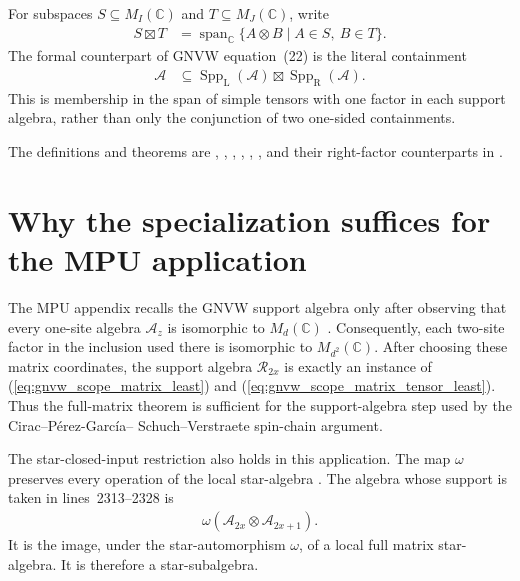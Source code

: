 \documentclass[11pt]{article}
\begin{document}
For subspaces $S\subseteq M_I(\mathbb C)$ and
$T\subseteq M_J(\mathbb C)$, write
\begin{align}
    S\boxtimes T
    &=\operatorname{span}_{\mathbb C}
      \{A\otimes B\mid A\in S,\ B\in T\}.
\end{align}
The formal counterpart of GNVW equation~(22) is the literal containment
\begin{align}
    \mathcal A
    &\subseteq
      \operatorname{Spp}_{\mathrm L}(\mathcal A)
      \boxtimes
      \operatorname{Spp}_{\mathrm R}(\mathcal A).
    \label{eq:gnvw_scope_matrix_two_factor}
\end{align}
This is membership in the span of simple tensors with one factor in each
support algebra, rather than only the conjunction of two one-sided
containments.

The definitions and theorems are
,
,
,
,
,
, and their
right-factor counterparts in
.

\section{Why the specialization suffices for the MPU application}

The MPU appendix recalls the GNVW support algebra only after observing that
every one-site algebra $\mathcal A_z$ is isomorphic to $M_d(\mathbb C)$
\cite[lines~2320--2334]{Cirac2017MPU}.
Consequently, each two-site factor in the inclusion used there is isomorphic
to $M_{d^2}(\mathbb C)$. After choosing these matrix coordinates, the support
algebra $\mathcal R_{2x}$ is exactly an instance of
(\ref{eq:gnvw_scope_matrix_least}) and
(\ref{eq:gnvw_scope_matrix_tensor_least}). Thus the full-matrix theorem is
sufficient for the support-algebra step used by the Cirac--P\'erez-Garc\'ia--
Schuch--Verstraete spin-chain argument.

The star-closed-input restriction also holds in this application.  The map
$\omega$ preserves every operation of the local star-algebra
\cite[lines~2300--2306]{Cirac2017MPU}.  The algebra whose support is taken in
lines~2313--2328 is
\begin{align}
    \omega(\mathcal A_{2x}\otimes\mathcal A_{2x+1}).
\end{align}
It is the image, under the star-automorphism $\omega$, of a local full matrix
star-algebra.  It is therefore a star-subalgebra.
\end{document}
